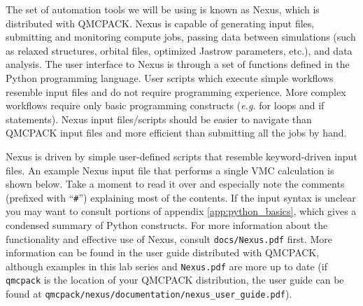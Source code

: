 The set of automation tools we will be using is known as Nexus, which is distributed with QMCPACK.  Nexus is capable of generating input files, submitting and monitoring compute jobs, passing data between simulations (such as relaxed structures, orbital files, optimized Jastrow parameters, etc.), and data analysis.  The user interface to Nexus is through a set of functions defined in the Python programming language.  User scripts which execute simple workflows resemble input files and do not require programming experience.  More complex workflows require only basic programming constructs (\emph{e.g.} for loops and if statements).  Nexus input files/scripts should be easier to navigate than QMCPACK input files and more efficient than submitting all the jobs by hand.

Nexus is driven by simple user-defined scripts that resemble keyword-driven input files.  An example Nexus input file that performs a single VMC calculation is shown below.  Take a moment to read it over and especially note the comments (prefixed with ``\texttt{\#}'') explaining most of the contents.  If the input syntax is unclear you may want to consult portions of appendix \ref{app:python_basics}, which gives a condensed summary of Python constructs.  For more information about the functionality and effective use of Nexus, consult \texttt{docs/Nexus.pdf} first.  More information can be found in the user guide distributed with QMCPACK, although examples in this lab series and \texttt{Nexus.pdf} are more up to date (if \texttt{qmcpack} is the location of your QMCPACK distribution, the user guide can be found at \texttt{qmcpack/nexus/documentation/nexus\_user\_guide.pdf}).

